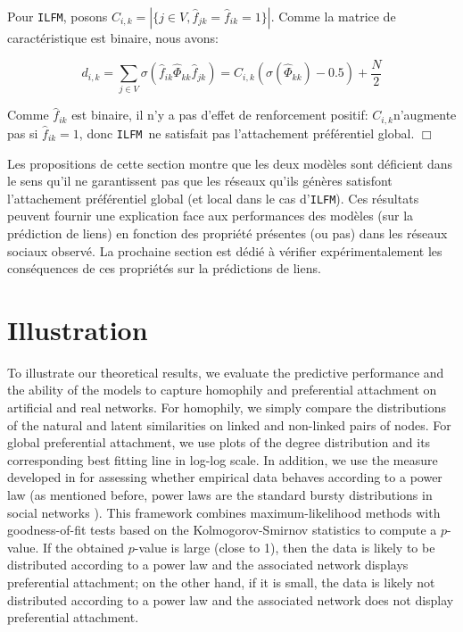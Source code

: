 \documentclass[french]{hermes-journal}
\newcommand{\ilfm}{\texttt{ILFM}}
\begin{document}
Pour \ilfm, posons $C_{i,k} = |\{j \in V, \hat{f}_{jk} = \hat{f}_{ik} = 1\}|$. Comme la matrice de caractéristique est binaire, nous avons: 

\[ 
d_{i,k} = \sum_{j\in V} \sigma(\hat{f}_{ik} \hat{\Phi}_{kk} \hat{f}_{jk}) =  C_{i,k} (\sigma(\hat{\Phi}_{kk})-0.5) + \frac{N}{2}
\]

Comme $\hat{f}_{ik}$  est binaire, il n'y a pas d'effet de  renforcement positif: $C_{i,k}$n'augmente pas si $\hat{f}_{ik}=1$, donc \ilfm\ ne satisfait  pas l'attachement préférentiel global. \hspace{4.69cm} $\Box$

Les propositions de cette section montre que les deux modèles sont déficient dans le sens qu'il ne garantissent pas que les réseaux qu'ils génères satisfont l'attachement préférentiel global (et local dans le cas d'\ilfm). Ces résultats peuvent fournir une explication face aux performances des modèles (sur la prédiction de liens) en fonction des propriété présentes (ou pas) dans les réseaux sociaux observé. 
La prochaine section est dédié à vérifier expérimentalement les conséquences de ces propriétés sur la prédictions de liens.

\section{Illustration}
\label{sec:exps}

To illustrate our theoretical results, we evaluate the predictive performance and the ability of the models to capture homophily and preferential attachment on artificial and real networks. For homophily, we simply compare the distributions of the natural and latent similarities on linked and non-linked pairs of nodes. For global preferential attachment, we use plots of the degree distribution and its corresponding best fitting line in log-log scale. In addition, we use the measure developed in \cite{clauset2009power} for assessing whether empirical data behaves according to a power law (as mentioned before, power laws are the standard bursty distributions in social networks \cite{barabasi1999emergence}). This framework combines maximum-likelihood methods with goodness-of-fit tests based on the Kolmogorov-Smirnov statistics to compute a $p$-value. If the obtained $p$-value is large (close to 1), then the data is likely to be distributed according to a power law and the associated network displays preferential attachment;  on the other hand, if it is small, the data is likely not distributed according to a power law and the associated network does not display preferential attachment.
\end{document}
